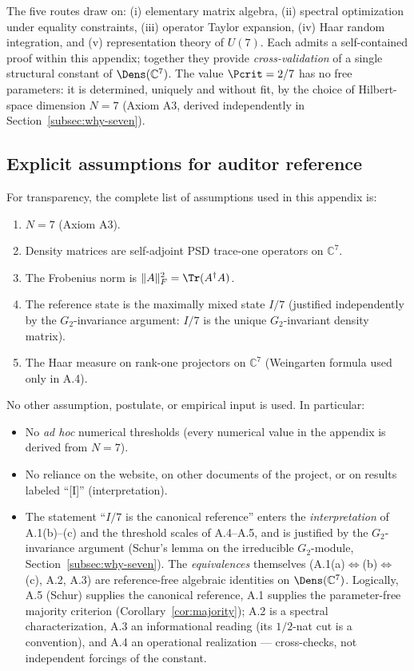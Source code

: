The five routes draw on: (i) elementary matrix algebra, (ii) spectral
optimization under equality constraints, (iii) operator Taylor expansion,
(iv) Haar random integration, and (v) representation theory of
$U(7)$. Each admits a self-contained proof within this appendix; together
they provide \emph{cross-validation} of a single structural constant of
$\Dens(\mathbb{C}^7)$. The value $\Pcrit = 2/7$ has no free parameters:
it is determined, uniquely and without fit, by the choice of Hilbert-space
dimension $N = 7$ (Axiom A3, derived independently in
Section~\ref{subsec:why-seven}).

\subsection{Explicit assumptions for auditor reference}
\label{app:pcrit-assumptions}

For transparency, the complete list of assumptions used in this appendix is:

\begin{enumerate}[leftmargin=2em,nosep]
  \item $N = 7$ (Axiom A3).
  \item Density matrices are self-adjoint PSD trace-one operators on $\mathbb{C}^7$.
  \item The Frobenius norm is $\|A\|_F^2 = \Tr(A^{\dagger}A)$.
  \item The reference state is the maximally mixed state $I/7$
    (justified independently by the $G_2$-invariance argument: $I/7$ is the unique
    $G_2$-invariant density matrix).
  \item The Haar measure on rank-one projectors on $\mathbb{C}^7$ (Weingarten formula used only in A.4).
\end{enumerate}

No other assumption, postulate, or empirical input is used. In particular:
\begin{itemize}[leftmargin=2em,nosep]
  \item No \emph{ad hoc} numerical thresholds (every numerical value in the
    appendix is derived from $N=7$).
  \item No reliance on the website, on other documents of the project, or
    on results labeled ``[I]'' (interpretation).
  \item The statement ``$I/7$ is the canonical reference'' enters the
    \emph{interpretation} of A.1(b)--(c) and the threshold scales of A.4--A.5,
    and is justified by the $G_2$-invariance argument (Schur's lemma on the
    irreducible $G_2$-module, Section~\ref{subsec:why-seven}). The
    \emph{equivalences} themselves (A.1(a)$\iff$(b)$\iff$(c), A.2, A.3) are
    reference-free algebraic identities on $\Dens(\mathbb{C}^7)$. Logically,
    A.5 (Schur) supplies the canonical reference, A.1 supplies the
    parameter-free majority criterion (Corollary~\ref{cor:majority}); A.2 is a
    spectral characterization, A.3 an informational reading (its $1/2$-nat cut
    is a convention), and A.4 an operational realization --- cross-checks, not
    independent forcings of the constant.
\end{itemize}
